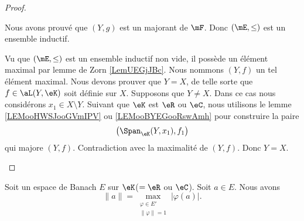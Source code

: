 \begin{proof}
\begin{subproof}
\begin{subproof}
				Nous avons prouvé que \( (Y,g)\) est un majorant de \( \mF\). Donc \( (\mE,\leq)\) est un ensemble inductif.
			\end{subproof}
			Vu que \( (\mE,\leq)\) est un ensemble inductif non vide, il possède un élément maximal par lemme de Zorn \ref{LemUEGjJBc}. Nous nommons \( (Y,f)\) un tel élément maximal.
			Nous devons prouver que \( Y=X\), de telle sorte que \( f\in\aL(Y,\eK)\) soit définie sur \( X\). Supposons que \( Y\neq X\). Dans ce cas nous considérons \( x_1\in X\setminus Y\). Suivant que \( \eK\) est \( \eR\) ou \( \eC\), nous utilisons le lemme \ref{LEMooHWSJooGVmIPV} ou \ref{LEMooBYEGooRswAmh} pour construire la paire
			\begin{equation}
				\big( \Span_{\eK}(Y,x_1),f_1 \big)
			\end{equation}
			qui majore \( (Y,f)\). Contradiction avec la maximalité de \( (Y,f)\). Donc \( Y=X\).
		\end{subproof}
	\end{proof}

	\begin{proposition}          \label{PROPooFJPXooWrjbuH}
		Soit un espace de Banach \( E\) sur \( \eK\)(\( =\eR\) ou \( \eC\)). Soit \( a\in E\). Nous avons
		\begin{equation}
			\| a \|=\max_{\substack{\varphi\in E'\\\| \varphi \|=1}}| \varphi(a) |.
		\end{equation}
	\end{proposition}

